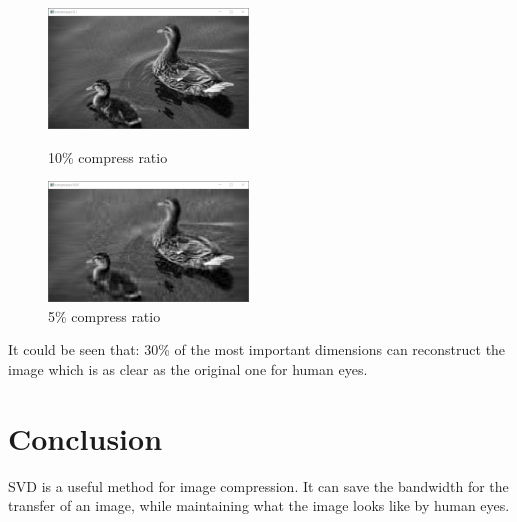 \documentclass{article}
\begin{document}
            \begin{figure}[htbp]
                \centering
                \begin{minipage}[t]{0.45\linewidth}
                    \centering
                    \includegraphics[height=3.2cm]{imgs/compressed-0.1.png}
                    \caption{10\% compress ratio}
                \end{minipage}
                \hfill
                \begin{minipage}[t]{0.45\linewidth}
                    \centering
                    \includegraphics[height=3.2cm]{imgs/compressed-0.05.png}
                    \caption{5\% compress ratio}
                \end{minipage}
            \end{figure}

            \par
            It could be seen that: 30\% of the most important dimensions can reconstruct
            the image which is as clear as the original one for human eyes.


    \section{Conclusion}
        \par
        SVD is a useful method for image compression.
        It can save the bandwidth for the transfer of an image,
        while maintaining what the image looks like by human eyes.
\end{document}
